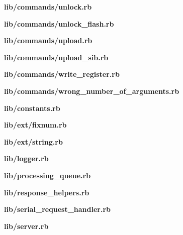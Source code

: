 \textbf{lib/commands/unlock.rb}

\textbf{lib/commands/unlock\_flash.rb}

\textbf{lib/commands/upload.rb}

\textbf{lib/commands/upload\_sib.rb}

\textbf{lib/commands/write\_register.rb}

\textbf{lib/commands/wrong\_number\_of\_arguments.rb}

\textbf{lib/constants.rb}

\textbf{lib/ext/fixnum.rb}

\textbf{lib/ext/string.rb}

\textbf{lib/logger.rb}

\textbf{lib/processing\_queue.rb}

\textbf{lib/response\_helpers.rb}

\textbf{lib/serial\_request\_handler.rb}

\textbf{lib/server.rb}


